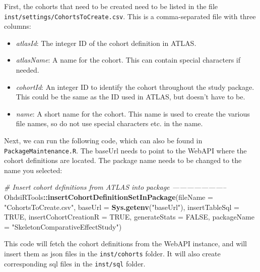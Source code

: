 \documentclass[
]{article}
\newenvironment{Shaded}{\begin{snugshade}}{\end{snugshade}}
\newcommand{\CommentTok}[1]{\textcolor[rgb]{0.56,0.35,0.01}{\textit{#1}}}
\newcommand{\DataTypeTok}[1]{\textcolor[rgb]{0.13,0.29,0.53}{#1}}
\newcommand{\KeywordTok}[1]{\textcolor[rgb]{0.13,0.29,0.53}{\textbf{#1}}}
\newcommand{\NormalTok}[1]{#1}
\newcommand{\OperatorTok}[1]{\textcolor[rgb]{0.81,0.36,0.00}{\textbf{#1}}}
\newcommand{\OtherTok}[1]{\textcolor[rgb]{0.56,0.35,0.01}{#1}}
\newcommand{\StringTok}[1]{\textcolor[rgb]{0.31,0.60,0.02}{#1}}
\providecommand{\tightlist}{%
  \setlength{\itemsep}{0pt}\setlength{\parskip}{0pt}}
\begin{document}
First, the cohorts that need to be created need to be listed in the file
\texttt{inst/settings/CohortsToCreate.csv}. This is a comma-separated
file with three columns:

\begin{itemize}
\tightlist
\item
  \emph{atlasId}: The integer ID of the cohort definition in ATLAS.
\item
  \emph{atlasName}: A name for the cohort. This can contain special
  characters if needed.
\item
  \emph{cohortId}: An integer ID to identify the cohort throughout the
  study package. This could be the same as the ID used in ATLAS, but
  doesn't have to be.
\item
  \emph{name}: A short name for the cohort. This name is used to create
  the various file names, so do not use special characters etc. in the
  name.
\end{itemize}

Next, we can run the following code, which can also be found in
\texttt{PackageMaintenance.R}. The baseUrl needs to point to the WebAPI
where the cohort definitions are located. The package name needs to be
changed to the name you selected:

\begin{Shaded}
\begin{Highlighting}[]
\CommentTok{# Insert cohort definitions from ATLAS into package -----------------------}
\NormalTok{OhdsiRTools}\OperatorTok{::}\KeywordTok{insertCohortDefinitionSetInPackage}\NormalTok{(}\DataTypeTok{fileName =} \StringTok{"CohortsToCreate.csv"}\NormalTok{,}
                                                \DataTypeTok{baseUrl =} \KeywordTok{Sys.getenv}\NormalTok{(}\StringTok{"baseUrl"}\NormalTok{),}
                                                \DataTypeTok{insertTableSql =} \OtherTok{TRUE}\NormalTok{,}
                                                \DataTypeTok{insertCohortCreationR =} \OtherTok{TRUE}\NormalTok{,}
                                                \DataTypeTok{generateStats =} \OtherTok{FALSE}\NormalTok{,}
                                                \DataTypeTok{packageName =} \StringTok{"SkeletonComparativeEffectStudy"}\NormalTok{)}
\end{Highlighting}
\end{Shaded}

This code will fetch the cohort definitions from the WebAPI instance,
and will insert them as json files in the \texttt{inst/cohorts} folder.
It will also create corresponding sql files in the \texttt{inst/sql}
folder.
\end{document}
